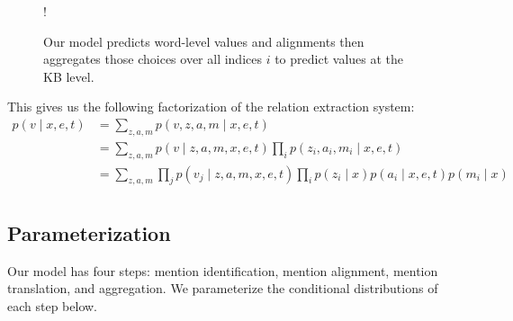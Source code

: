\documentclass[12pt]{article}
\begin{document}
\begin{figure}[h]
\begin{center}
\resizebox {.3\columnwidth} {!} {
} %
\end{center}
\caption{Our model predicts word-level values and alignments
then aggregates those choices over all indices $i$ to
predict values at the KB level.
}
\label{fig:infmodel}
\end{figure}

This gives us the following factorization of the relation extraction system:
\begin{equation}
\label{eqn:prob}
\begin{aligned}
p(v \mid x,e,t) &= \sum_{z,a,m} p(v,z,a,m\mid x,e,t)\\
&= \sum_{z,a,m} p(v\mid z,a,m,x,e,t) \prod_i p(z_i, a_i, m_i\mid x,e,t)\\
&= \sum_{z,a,m} \prod_j p(v_j\mid z,a,m,x,e,t) \prod_i p(z_i\mid x)p(a_i\mid x,e,t)p(m_i\mid x)\\
\end{aligned}
\end{equation}

\subsection{Parameterization}
Our model has four steps: mention identification, mention alignment, 
mention translation, and aggregation.
We parameterize the conditional distributions of each step below.
\end{document}
